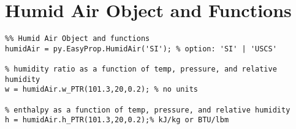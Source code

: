 \section{Humid Air Object and Functions}

\begin{fullwidth}
\begin{lstlisting}
%% Humid Air Object and functions
humidAir = py.EasyProp.HumidAir('SI'); % option: 'SI' | 'USCS'

% humidity ratio as a function of temp, pressure, and relative humidity
w = humidAir.w_PTR(101.3,20,0.2); % no units

% enthalpy as a function of temp, pressure, and relative humidity
h = humidAir.h_PTR(101.3,20,0.2);% kJ/kg or BTU/lbm

\end{lstlisting}
\end{fullwidth}



